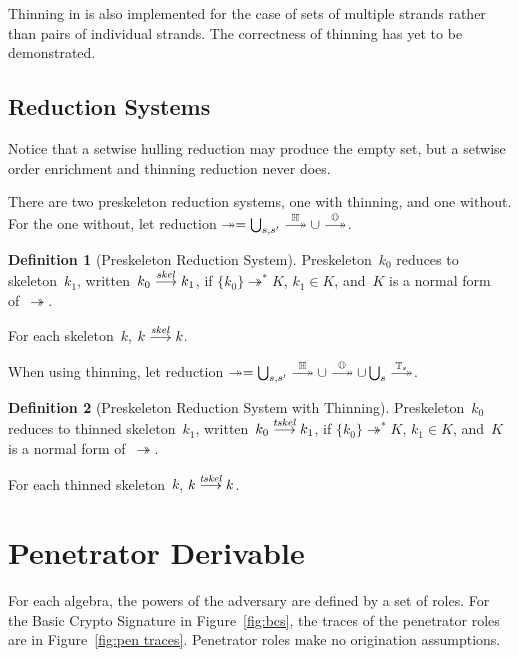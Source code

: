 \documentclass[12pt]{report}
\theoremstyle{definition}
\newtheorem{defn}{Definition}[chapter]
\begin{document}
Thinning in {\cpsa} is also implemented for the case of sets of
multiple strands rather than pairs of individual strands.  The
correctness of thinning has yet to be demonstrated.

\section{Reduction Systems}

Notice that a setwise hulling reduction may produce the empty set, but
a setwise order enrichment and thinning reduction never does.

There are two preskeleton reduction systems, one with thinning, and one
without.  For the one without, let reduction $\twoheadrightarrow=
\bigcup_{s,s'}\setreduction{\ops{H}}\cup\setreduction{\ops{O}}$.

\begin{defn}[Preskeleton Reduction System]
Preskeleton~$k_0$ reduces to skeleton~$k_1$,
written~$k_0\stackrel{\operatorname{\mathit{skel}}}{\longrightarrow}k_1$, if
$\{k_0\}\twoheadrightarrow^\ast K$, $k_1\in K$, and~$K$ is a normal
form of~$\twoheadrightarrow$.
\end{defn}

For each skeleton~$k$, $k\stackrel{\operatorname{\mathit{skel}}}{\longrightarrow}k$.

When using thinning, let reduction $\twoheadrightarrow=
\bigcup_{s,s'}\setreduction{\ops{H}}\cup\setreduction{\ops{O}}\cup
\bigcup_s\setreduction{\ops{T}_s}$.

\begin{defn}[Preskeleton Reduction System with Thinning]
Preskeleton~$k_0$ reduces to thinned skeleton~$k_1$,
written~$k_0\stackrel{\operatorname{\mathit{tskel}}}{\longrightarrow}k_1$, if
$\{k_0\}\twoheadrightarrow^\ast K$, $k_1\in K$, and~$K$ is a normal
form of~$\twoheadrightarrow$.
\end{defn}

For each thinned skeleton~$k$, $k\stackrel{\operatorname{\mathit{tskel}}}{\longrightarrow}k$.

\chapter{Penetrator Derivable}\label{chp:penetrator derivable}

For each algebra, the powers of the adversary are defined by a set of
roles.  For the Basic Crypto Signature in Figure~\ref{fig:bcs}, the
traces of the penetrator roles are in Figure~\ref{fig:pen traces}.
Penetrator roles make no origination assumptions.
\end{document}
